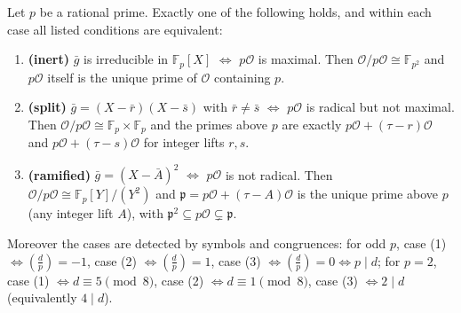 \begin{theorem}
  \label{prop-3-2-1-trichotomy}
  Let $p$ be a rational prime. Exactly one of the following holds, and
  within each case all listed conditions are equivalent:
  \begin{enumerate}
    \item \textbf{(inert)} $\bar g$ is irreducible in $\mathbb{F}_p[X]$
      $\iff$ $p\mathcal{O}$ is maximal. Then $\mathcal{O}/p\mathcal{O} \cong
      \mathbb{F}_{p^2}$ and $p\mathcal{O}$ itself is the unique prime of
      $\mathcal{O}$ containing $p$.
    \item \textbf{(split)} $\bar g = (X - \bar r)(X - \bar s)$ with $\bar r
      \neq \bar s$ $\iff$ $p\mathcal{O}$ is radical but not maximal. Then
      $\mathcal{O}/p\mathcal{O} \cong \mathbb{F}_p \times \mathbb{F}_p$ and
      the primes above $p$ are exactly $p\mathcal{O} + (\tau - r)\mathcal{O}$
      and $p\mathcal{O} + (\tau - s)\mathcal{O}$ for integer lifts $r, s$.
    \item \textbf{(ramified)} $\bar g = (X - \bar A)^2$ $\iff$
      $p\mathcal{O}$ is not radical. Then $\mathcal{O}/p\mathcal{O} \cong
      \mathbb{F}_p[Y]/(Y^2)$ and $\mathfrak{p} = p\mathcal{O} +
      (\tau - A)\mathcal{O}$ is the unique prime above $p$ (any integer lift
      $A$), with $\mathfrak{p}^2 \subseteq p\mathcal{O} \subsetneq
      \mathfrak{p}$.
  \end{enumerate}
  Moreover the cases are detected by symbols and congruences: for odd $p$,
  case (1) $\iff \left(\frac dp\right) = -1$, case (2) $\iff
  \left(\frac dp\right) = 1$, case (3) $\iff \left(\frac dp\right) = 0
  \iff p \mid d$; for $p = 2$, case (1) $\iff d \equiv 5 \pmod 8$, case (2)
  $\iff d \equiv 1 \pmod 8$, case (3) $\iff 2 \mid d$ (equivalently
  $4 \mid d$).
\end{theorem}

